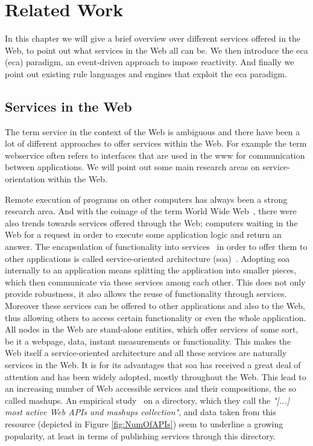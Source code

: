 
\chapter{Related Work}

In this chapter we will give a brief overview over different services offered in the Web, to point out what services in the Web all can be.
We then introduce the \textrm{\acrlong{eca}} (\textrm{\acrshort{eca}}) paradigm, an event-driven approach to impose reactivity.
And finally we point out existing rule languages and engines that exploit the \textrm{\acrshort{eca}} paradigm.

\section{Services in the Web}
The term service in the context of the Web is ambiguous and there have been a lot of different approaches to offer services within the Web.
For example the term \textrm{\gls{webservice}} often refers to interfaces that are used in the \textrm{\gls{www}} for communication between applications.
We will point out some main research areas on service-orientation within the Web.

Remote execution of programs on other computers has always been a strong research area. And with the coinage of the term \textrm{World Wide Web}~\cite{DBLP:journals/en/Berners-LeeCGP92}, there were also trends towards services offered through the Web; computers waiting in the Web for a request in order to execute some application logic and return an answer.
The encapsulation of functionality into services~\cite{peltz2003web} in order to offer them to other applications is called service-oriented architecture (\textrm{\acrshort{soa}})~\cite{perrey2003service}.
Adopting \textrm{\acrshort{soa}} internally to an application means splitting the application into smaller pieces, which then communicate via these services among each other.
This does not only provide robustness, it also allows the reuse of functionality through services.
Moreover these services can be offered to other applications and also to the Web, thus allowing others to access certain functionality or even the whole application.
All nodes in the Web are stand-alone entities, which offer services of some sort, be it a webpage, data, instant measurements or functionality.
This makes the Web itself a service-oriented architecture and all these services are naturally services in the Web.
It is for its advantages that \textrm{\acrshort{soa}} has received a great deal of attention and has been widely adopted, mostly throughout the Web.
This lead to an increasing number of Web accessible services and their compositions, the so called \textrm{\gls{mashup}s}.
An empirical study~\cite{conf/icws/HuangFT12} on a directory, which they call the \textit{"[...] most active Web APIs and mashups collection"}, and data taken from this resource (depicted in Figure \ref{fig:NumOfAPIs}) seem to underline a growing popularity, at least in terms of publishing services through this directory.

